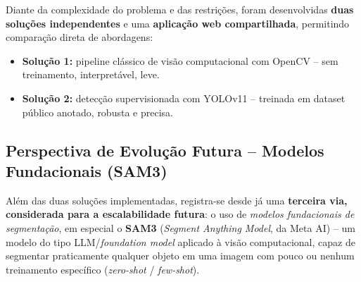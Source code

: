 \documentclass[12pt,a4paper]{article}
\begin{document}
Diante da complexidade do problema e das restri\c{c}\~oes, foram desenvolvidas
\textbf{duas solu\c{c}\~oes independentes} e uma \textbf{aplica\c{c}\~ao web compartilhada},
permitindo compara\c{c}\~ao direta de abordagens:

\begin{itemize}[leftmargin=*]
  \item \textbf{Solu\c{c}\~ao 1:} pipeline cl\'assico de vis\~ao computacional com OpenCV --
        sem treinamento, interpret\'avel, leve.
  \item \textbf{Solu\c{c}\~ao 2:} detec\c{c}\~ao supervisionada com YOLOv11 -- treinada
        em dataset p\'ublico anotado, robusta e precisa.
\end{itemize}

\subsection{Perspectiva de Evolu\c{c}\~ao Futura -- Modelos Fundacionais (SAM3)}
\label{sec:sam3}

Al\'em das duas solu\c{c}\~oes implementadas, registra-se desde j\'a uma \textbf{terceira
via, considerada para a escalabilidade futura}: o uso de \emph{modelos fundacionais de
segmenta\c{c}\~ao}, em especial o \textbf{SAM3} (\emph{Segment Anything Model}, da
Meta AI) -- um modelo do tipo LLM/\emph{foundation model} aplicado \`a vis\~ao
computacional, capaz de segmentar praticamente qualquer objeto em uma imagem com pouco
ou nenhum treinamento espec\'ifico (\emph{zero-shot} / \emph{few-shot}).
\end{document}
